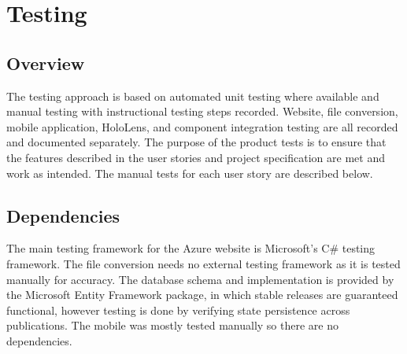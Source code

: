 

\chapter{Testing}
\label{ch:testing}


\section{Overview}
The testing approach is based on automated unit testing where available and manual testing with instructional testing steps recorded. Website, file conversion, mobile application, HoloLens, and component integration testing are all recorded and documented separately. The purpose of the product tests is to ensure that the features described in the user stories and project specification are met and work as intended. The manual tests for each user story are described below.

\section{Dependencies}
The main testing framework for the Azure website is Microsoft's C\# testing framework. The file conversion needs no external testing framework as it is tested manually for accuracy. The database schema and implementation is provided by the Microsoft Entity Framework package, in which stable releases are guaranteed functional, however testing is done by verifying state persistence across publications. The mobile was mostly tested manually so there are no dependencies.















